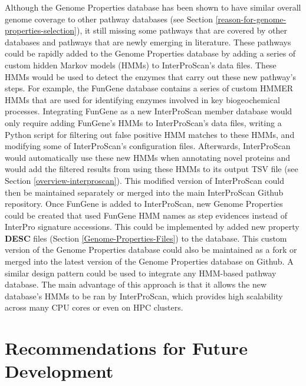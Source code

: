 Although the Genome Properties database has been shown to have similar overall genome coverage to other pathway databases (see Section \ref{reason-for-genome-properties-selection}), it still missing some pathways that are covered by other databases and pathways that are newly emerging in literature. These pathways could be rapidly added to the Genome Properties database by adding a series of custom hidden Markov models (HMMs) \cite{eddy2011accelerated} to InterProScan's data files. These HMMs would be used to detect the enzymes that carry out these new pathway's steps. For example, the FunGene \cite{fish2013fungene} database contains a series of custom HMMER \cite{eddy2011accelerated} HMMs that are used for identifying enzymes involved in key biogeochemical processes. Integrating FunGene as a new InterProScan member database would only require adding FunGene's HMMs to InterProScan's data files, writing a Python script for filtering out false positive HMM matches to these HMMs, and modifying some of InterProScan's configuration files. Afterwards, InterProScan would automatically use these new HMMs when annotating novel proteins and would add the filtered results from using these HMMs to its output TSV file (see Section \ref{overview-interproscan}). This modified version of InterProScan could then be maintained separately or merged into the main InterProScan Github repository. Once FunGene is added to InterProScan, new Genome Properties could be created that used FunGene HMM names as step evidences instead of InterPro signature accessions. This could be implemented by added new property \textbf{DESC} files (Section \ref{Genome-Properties-Files}) to the database. This custom version of the Genome Properties database could also be maintained as a fork or merged into the latest version of the Genome Properties database on Github. A similar design pattern could be used to integrate any HMM-based pathway database. The main advantage of this approach is that it allows the new database's HMMs to be ran by InterProScan, which provides high scalability across many CPU cores or even on HPC clusters.

\section{Recommendations for Future Development}

